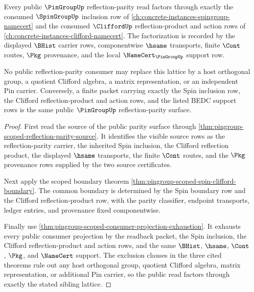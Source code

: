 \begin{theorem}
\label{thm:pingroup-spin-clifford-sibling-lattice}
Every public $\PinGroupUp$ reflection-parity read factors through exactly the
consumed $\SpinGroupUp$ inclusion row of
\autoref{ch:concrete-instances-spingroup-namecert} and the consumed
$\CliffordUp$ reflection-product and action rows of
\autoref{ch:concrete-instances-clifford-namecert}. The factorization is
recorded by the displayed $\BHist$ carrier rows, componentwise $\hsame$
transports, finite $\Cont$ routes, $\Pkg$ provenance, and the local
$\NameCert_{\PinGroupUp}$ support row.

No public reflection-parity consumer may replace this lattice by a host
orthogonal group, a quotient Clifford algebra, a matrix representation, or an
independent Pin carrier. Conversely, a finite packet carrying exactly the
Spin inclusion row, the Clifford reflection-product and action rows, and the
listed BEDC support rows is the same public $\PinGroupUp$ reflection-parity
surface.
\end{theorem}
\begin{proof}
First read the source of the public parity surface through
\autoref{thm:pingroup-scoped-reflection-parity-source}. It identifies the
visible source rows as the reflection-parity carrier, the inherited Spin
inclusion, the Clifford reflection product, the displayed $\hsame$
transports, the finite $\Cont$ routes, and the $\Pkg$ provenance rows supplied
by the two source certificates.

Next apply the scoped boundary theorem
\autoref{thm:pingroup-scoped-spin-clifford-boundary}. The common boundary is
determined by the Spin boundary row and the Clifford reflection-product row,
with the parity classifier, endpoint transports, ledger entries, and
provenance fixed componentwise.

Finally use
\autoref{thm:pingroup-scoped-consumer-projection-exhaustion}. It exhausts
every public consumer projection by the readback packet, the Spin inclusion,
the Clifford reflection-product and action rows, and the same $\BHist$,
$\hsame$, $\Cont$, $\Pkg$, and $\NameCert$ support. The exclusion clauses in
the three cited theorems rule out any host orthogonal group, quotient
Clifford algebra, matrix representation, or additional Pin carrier, so the
public read factors through exactly the stated sibling lattice.
\end{proof}
